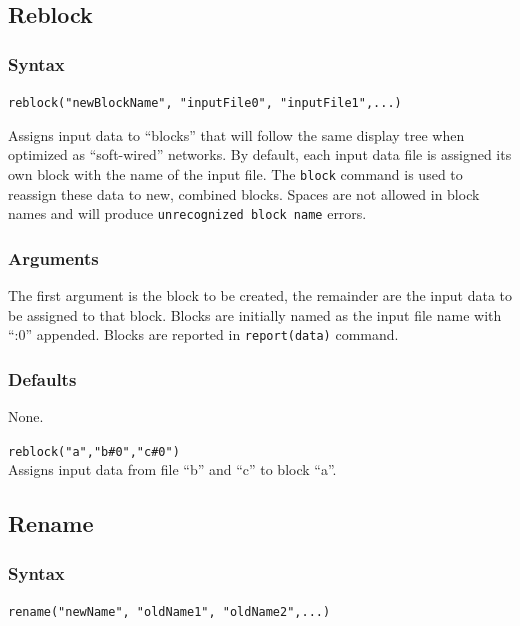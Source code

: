 \subsection{Reblock}
	\subsubsection{Syntax}
		\texttt{reblock("newBlockName", "inputFile0", "inputFile1",...)}
	
	\begin{phygdescription}
	{Assigns input data to ``blocks'' that will follow the same display tree when optimized
	as ``soft-wired'' networks. By default, each input data file is assigned its own block with 
	the name of the input file. The \texttt{block} command is used to reassign these data to 
	new, combined blocks. Spaces are not allowed in block names and will produce 
	\texttt{unrecognized block name} errors.} 
	\end{phygdescription}
	
	\subsubsection{Arguments}
		The first argument is the block to be created, the remainder are the input data to 
		be assigned to that block. Blocks are initially named as the input file name with 
		``:0'' appended. Blocks are reported in \texttt{report(data)} command.
	
	\subsubsection{Defaults}
		None.
	
	\begin{example}

		\item{\texttt{reblock("a","b\#0","c\#0")}\\ Assigns input data from file ``b'' and ``c'' 
		to block ``a''. }
	
	\end{example}

\subsection{Rename}
	\label{subsec:Rename}
	\subsubsection{Syntax}
		\texttt{rename("newName", "oldName1", "oldName2",...)}
		
